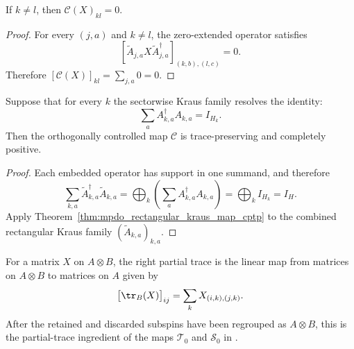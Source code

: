 \begin{theorem}
    \label{thm:mpdo_controlled_kraus_map_off_block}
    \leanok
    If $k\ne l$, then $\mathcal C(X)_{kl}=0$.
\end{theorem}
\begin{proof}
    \leanok
    For every $(j,a)$ and $k\ne l$, the zero-extended operator satisfies
    \[
      [\widetilde A_{j,a}X\widetilde A_{j,a}^\dagger]
        _{(k,b),(l,c)}=0.
    \]
    Therefore $[\mathcal C(X)]_{kl}=\sum_{j,a}0=0$.
\end{proof}

\begin{theorem}
    \label{thm:mpdo_controlled_kraus_map_cptp}
    \leanok
    Suppose that for every $k$ the sectorwise Kraus family resolves the
    identity:
    \[
        \sum_a A_{k,a}^{\dagger}A_{k,a}=I_{H_k}.
    \]
    Then the orthogonally controlled map $\mathcal C$ is
    trace-preserving and completely positive.
\end{theorem}
\begin{proof}
    \leanok
    Each embedded operator has support in one summand, and therefore
    \[
        \sum_{k,a}\widetilde A_{k,a}^{\dagger}\widetilde A_{k,a}
        =\bigoplus_k\left(\sum_a A_{k,a}^{\dagger}A_{k,a}\right)
        =\bigoplus_k I_{H_k}=I_H.
    \]
    Apply Theorem~\ref{thm:mpdo_rectangular_kraus_map_cptp} to the combined
    rectangular Kraus family $(\widetilde A_{k,a})_{k,a}$.
\end{proof}

\begin{definition}
    \label{def:mpdo_right_partial_trace_map}
    \leanok
    For a matrix $X$ on $A\otimes B$, the right partial trace is the linear map
    from matrices on $A\otimes B$ to matrices on $A$ given by
    \[
        \bigl[\tr_{B}(X)\bigr]_{ij}
        =
        \sum_{k}X_{(i,k),(j,k)}.
    \]
    After the retained and discarded subspins have been regrouped as
    $A\otimes B$, this is the partial-trace ingredient of the maps
    $\mathcal T_0$ and $\mathcal S_0$ in
    \cite[Appendix~C.2, lines~1521--1522 and~1547]{Cirac2016MPDO_arXiv}.
\end{definition}

